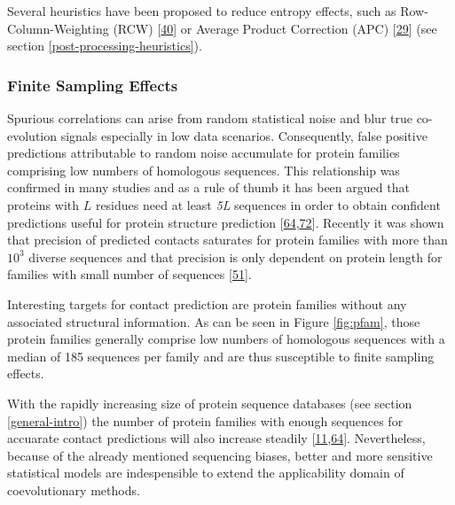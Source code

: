 \documentclass[12pt,a4paper,twoside]{book}
\theoremstyle{definition}
\theoremstyle{definition}
\theoremstyle{remark}
\begin{document}
Several heuristics have been proposed to reduce entropy effects, such as
Row-Column-Weighting (RCW)
{[}\protect\hyperlink{ref-Gouveia_Oliveira2007}{40}{]} or Average
Product Correction (APC) {[}\protect\hyperlink{ref-Dunn2008}{29}{]} (see
section \ref{post-processing-heuristics}).

\subsubsection*{Finite Sampling Effects}\label{finite-sampling-effects}

Spurious correlations can arise from random statistical noise and blur
true co-evolution signals especially in low data scenarios.
Consequently, false positive predictions attributable to random noise
accumulate for protein families comprising low numbers of homologous
sequences. This relationship was confirmed in many studies and as a rule
of thumb it has been argued that proteins with \(L\) residues need at
least \emph{5L} sequences in order to obtain confident predictions
useful for protein structure prediction
{[}\protect\hyperlink{ref-Kamisetty2013}{64},\protect\hyperlink{ref-Marks2012}{72}{]}.
Recently it was shown that precision of predicted contacts saturates for
protein families with more than \(10^3\) diverse sequences and that
precision is only dependent on protein length for families with small
number of sequences {[}\protect\hyperlink{ref-Anishchenko2017}{51}{]}.

Interesting targets for contact prediction are protein families without
any associated structural information. As can be seen in Figure
\ref{fig:pfam}, those protein families generally comprise low numbers of
homologous sequences with a median of 185 sequences per family and are
thus susceptible to finite sampling effects.

With the rapidly increasing size of protein sequence databases (see
section \ref{general-intro}) the number of protein families with enough
sequences for accuarate contact predictions will also increase steadily
{[}\protect\hyperlink{ref-TheUniProtConsortium2013}{11},\protect\hyperlink{ref-Kamisetty2013}{64}{]}.
Nevertheless, because of the already mentioned sequencing biases, better
and more sensitive statistical models are indespensible to extend the
applicability domain of coevolutionary methods.
\end{document}

